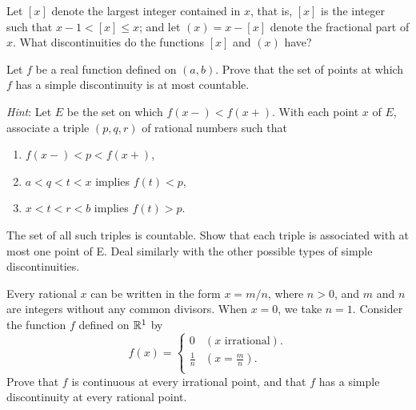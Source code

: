 \begin{myExercise}
    \label{ex:4.16}
    Let $[x]$ denote the largest integer contained in $x$, 
    that is, $[x]$ is the integer such that $x - 1 < [x] \leq x$; 
    and let $(x) = x - [x]$ denote the fractional part of $x$. 
    What discontinuities do the functions $[x]$ and $(x)$ have?
\end{myExercise}


\begin{myExercise}
    \label{ex:4.17}
    Let $f$ be a real function defined on $(a, b)$. 
    Prove that the set of points at which $f$ has a simple discontinuity is at most countable. 
    
    \emph{Hint}: Let $E$ be the set on which $f(x-) <f(x+ )$. 
    With each point $x$ of $E$, associate a triple $(p, q, r)$ of rational numbers such that 
    \begin{enumerate}
        \item $f(x-) < p <f(x+ )$,
        \item $a < q < t < x$ implies $f(t) < p$,
        \item $x < t < r < b$ implies $f(t) > p$.
    \end{enumerate} 
    The set of all such triples is countable. 
    Show that each triple is associated with at most one point of E. Deal similarly with the other possible types of simple discontinuities.
\end{myExercise}


\begin{myExercise}
    \label{ex:4.18}
    Every rational $x$ can be written in the form $x = m/n$, 
    where $n > 0$, and $m$ and $n$ are integers without any common divisors. 
    When $x = 0$, we take $n = 1$. 
    Consider the function $f$ defined on ${\protect\mathbb R}^1$ by 
    \begin{equation*}
        f(x) = \left\{ 
            \begin{array}{ll}
                0 & (x \text{ irrational}). \\
                \frac{1}{n} & \left( x = \frac{m}{n} \right) .\\
            \end{array}
        \right.
    \end{equation*} 
    Prove that $f$ is continuous at every irrational point, 
    and that $f$ has a simple discontinuity at every rational point.
\end{myExercise}


